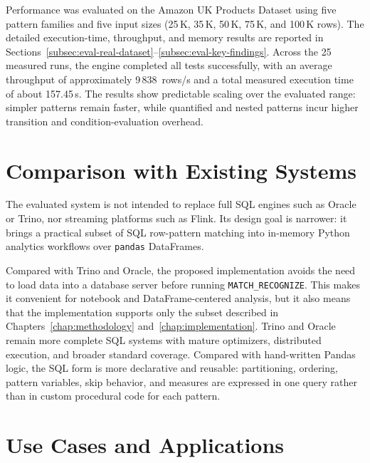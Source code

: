 Performance was evaluated on the Amazon UK Products Dataset using
five pattern families and five input sizes (25\,K, 35\,K, 50\,K,
75\,K, and 100\,K rows).  The detailed execution-time, throughput,
and memory results are reported in
Sections~\ref{subsec:eval-real-dataset}--\ref{subsec:eval-key-findings}.
Across the 25 measured runs, the engine completed all tests
successfully, with an average throughput of approximately
9\,838~rows/s and a total measured execution time of about
157.45\,s.  The results show predictable scaling over the evaluated
range: simpler patterns remain faster, while quantified and nested
patterns incur higher transition and condition-evaluation overhead.

\section{Comparison with Existing Systems}
\label{sec:eval-comparison}

The evaluated system is not intended to replace full SQL engines such
as Oracle or Trino, nor streaming platforms such as Flink.  Its design
goal is narrower: it brings a practical subset of SQL row-pattern
matching into in-memory Python analytics workflows over
\texttt{pandas} DataFrames.

Compared with Trino and Oracle, the proposed implementation avoids the
need to load data into a database server before running
\texttt{MATCH\_RECOGNIZE}.  This makes it convenient for notebook and
DataFrame-centered analysis, but it also means that the implementation
supports only the subset described in Chapters~\ref{chap:methodology}
and~\ref{chap:implementation}.  Trino and Oracle remain more complete
SQL systems with mature optimizers, distributed execution, and broader
standard coverage.  Compared with hand-written Pandas logic, the SQL
form is more declarative and reusable: partitioning, ordering, pattern
variables, skip behavior, and measures are expressed in one query
rather than in custom procedural code for each pattern.

\section{Use Cases and Applications}
\label{sec:eval-usecases}

